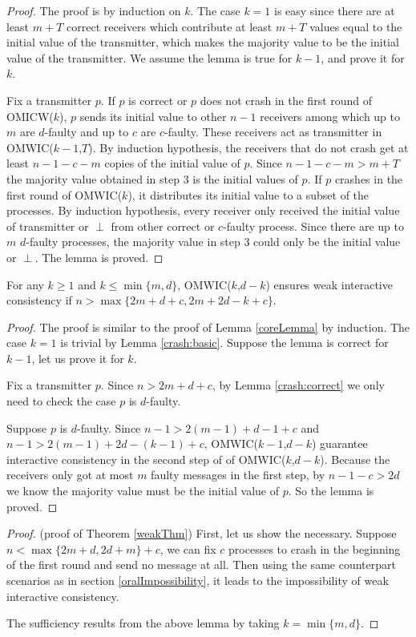 \begin{proof}
  The proof is by induction on $k$. The case $k=1$ is easy since there are at
  least $m+T$ correct receivers which contribute at least $m+T$ values equal
  to the initial value of the transmitter, which makes the majority value to
  be the initial value of the transmitter. We assume the lemma is true for
  $k-1$, and prove it for $k$.
  
  Fix a transmitter $p$. If $p$ is correct or $p$ does not crash in the first
  round of OMICW($k$), $p$ sends its initial value to other $n-1$ receivers
  among which up to $m$ are $d$-faulty and up to $c$ are $c$-faulty. These
  receivers act as transmitter in OMWIC($k-1$,$T$). By induction hypothesis,
  the receivers that do not crash get at least $n-1-c-m$ copies of the
  initial value of $p$. Since $n-1-c-m>m+T$ the majority value obtained in
  step $3$ is the initial values of $p$. If $p$ crashes in the first round of
  OMWIC($k$), it distributes its initial value to a subset of the processes.
  By induction hypothesis, every receiver only received the initial value of
  transmitter or $\perp$ from other correct or $c$-faulty process. Since
  there are up to $m$ $d$-faulty processes, the majority value in step $3$
  could only be the initial value or $\perp$. The lemma is proved.
\end{proof}

\begin{lemma}
  For any $k \geqslant 1$ and $k \leqslant \min \{ m,d \}$, OMWIC($k$,$d-k$)
  ensures weak interactive consistency if $n> \max \{ 2m+d+c,2m+2d-k+c \}$.
\end{lemma}

\begin{proof}
  The proof is similar to the proof of Lemma \ref{coreLemma} by induction. The case
  $k=1$ is trivial by Lemma \ref{crash:basic}. Suppose the lemma is correct for $k-1$,
  let us prove it for $k$.
  
  Fix a transmitter $p$. Since $n>2m+d+c$, by Lemma \ref{crash:correct} we only need to
  check the case $p$ is $d$-faulty.
  
  Suppose $p$ is $d$-faulty. Since $n-1>2 ( m-1 ) +d-1+c$ and $n-1>2 ( m-1 )
  +2d- ( k-1 ) +c$, OMWIC($k-1$,$d-k$) guarantee interactive consistency in
  the second step of of OMWIC($k$,$d-k$). Because the receivers only got at
  most $m$ faulty messages in the first step, by $n-1-c>2d$ we know the
  majority value must be the initial value of $p$. So the lemma is proved.
\end{proof}

\begin{proof}
  (proof of Theorem \ref{weakThm}) First, let us show the necessary. Suppose $n<
  \max \{ 2m+d,2d+m \} +c$, we can fix $c$ processes to crash in the beginning
  of the first round and send no message at all. Then using the same
  counterpart scenarios as in section \ref{oralImpossibility}, it leads to the impossibility
  of weak interactive consistency.
  
  The sufficiency results from the above lemma by taking $k= \min \{ m,d \}$.
\end{proof}
